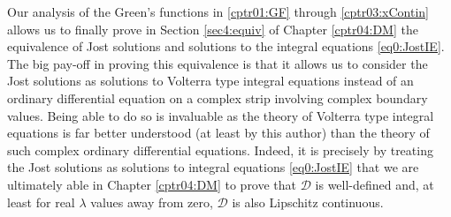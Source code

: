 \documentclass[../dissertation.tex]{subfiles}
\begin{document}
Our analysis of the Green's functions in \ref{cptr01:GF} through 
\ref{cptr03:xContin} allows us to finally prove in Section \ref{sec4:equiv}
of Chapter \ref{cptr04:DM} the equivalence of Jost solutions and solutions to
the integral equations \eqref{eq0:JostIE}. The big pay-off in proving this 
equivalence is that it allows us to consider the Jost solutions as solutions
to Volterra type integral equations instead of an ordinary differential 
equation on a complex strip involving complex boundary values. Being able to do
so is invaluable as the theory of Volterra type integral equations is far better 
understood (at least by this author) than the theory of such complex ordinary 
differential equations. Indeed, it is precisely by treating the Jost solutions 
as solutions to integral equations \eqref{eq0:JostIE} that we are ultimately 
able in Chapter \ref{cptr04:DM} to prove that $\mathscr D$ is well-defined and, 
at least for real $\lambda$ values away from zero, $\mathscr D$ is also 
Lipschitz continuous.
\end{document}
